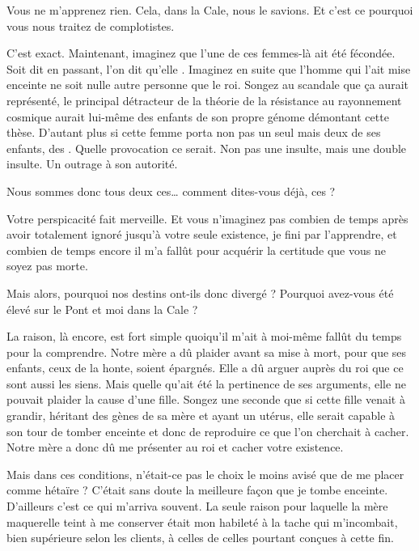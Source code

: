 \begin{drama}
   \elaspeaks Vous ne m’apprenez rien. Cela, dans la Cale, nous le savions. Et c’est ce pourquoi vous nous traitez de complotistes.

   \elenaspeaks C’est exact. Maintenant, imaginez que l’une de ces femmes-là ait été fécondée. Soit dit en passant, l’on dit qu’elle . Imaginez en suite que l’homme qui l’ait mise enceinte ne soit nulle autre personne que le roi. Songez au scandale que ça aurait représenté, le principal détracteur de la théorie de la résistance au rayonnement cosmique aurait lui-même des enfants de son propre génome démontant cette thèse. D’autant plus si cette femme porta non pas un seul mais deux de ses enfants, des . Quelle provocation ce serait. Non pas une insulte, mais une double insulte. Un outrage à son autorité.

   \elaspeaks Nous sommes donc tous deux ces… comment dites-vous déjà, ces  ?

   \elenaspeaks Votre perspicacité fait merveille. Et vous n’imaginez pas combien de temps après avoir totalement ignoré jusqu’à votre seule existence, je fini par l’apprendre, et combien de temps encore il m’a fallût pour acquérir la certitude que vous ne soyez pas morte.

   \elaspeaks Mais alors, pourquoi nos destins ont-ils donc divergé ? Pourquoi avez-vous été élevé sur le Pont et moi dans la Cale ?

   \elenaspeaks La raison, là encore, est fort simple quoiqu’il m’ait à moi-même fallût du temps pour la comprendre. Notre mère a dû plaider avant sa mise à mort, pour que ses enfants, ceux de la honte, soient épargnés. Elle a dû arguer auprès du roi que ce sont aussi les siens. Mais quelle qu’ait été la pertinence de ses arguments, elle ne pouvait plaider la cause d’une fille. Songez une seconde que si cette fille venait à grandir, héritant des gènes de sa mère et ayant un utérus, elle serait capable à son tour de tomber enceinte et donc de reproduire ce que l’on cherchait à cacher. Notre mère a donc dû me présenter au roi et cacher votre existence.

   \elaspeaks Mais dans ces conditions, n’était-ce pas le choix le moins avisé que de me placer comme hétaïre ? C’était sans doute la meilleure façon que je tombe enceinte. D’ailleurs c’est ce qui m’arriva souvent. La seule raison pour laquelle la mère maquerelle teint à me conserver était mon habileté à la tache qui m’incombait, bien supérieure selon les clients, à celles de celles pourtant conçues à cette fin.


\end{drama}
